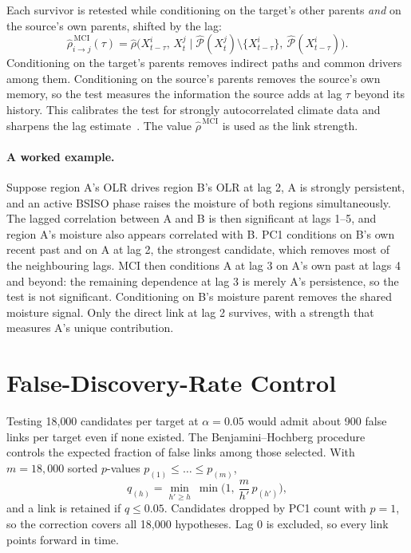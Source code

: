 Each survivor is retested while conditioning on the target's other parents \emph{and} on the source's own parents, shifted by the lag:
\begin{equation}
  \hat\rho^{\,\mathrm{MCI}}_{i\to j}(\tau)=\hat\rho\Big(X^i_{t-\tau},\,X^j_t\;\Big|\;\hat{\mathcal{P}}(X^j_t)\setminus\{X^i_{t-\tau}\},\ \hat{\mathcal{P}}(X^i_{t-\tau})\Big).
  \label{eq:mci}
\end{equation}
Conditioning on the target's parents removes indirect paths and common drivers among them. Conditioning on the source's parents removes the source's own memory, so the test measures the information the source adds at lag $\tau$ beyond its history. This calibrates the test for strongly autocorrelated climate data and sharpens the lag estimate~\cite{runge2019detecting}. The value $\hat\rho^{\,\mathrm{MCI}}$ is used as the link strength.

\paragraph{A worked example.} Suppose region A's OLR drives region B's OLR at lag 2, A is strongly persistent, and an active BSISO phase raises the moisture of both regions simultaneously. The lagged correlation between A and B is then significant at lags 1--5, and region A's moisture also appears correlated with B. PC1 conditions on B's own recent past and on A at lag 2, the strongest candidate, which removes most of the neighbouring lags. MCI then conditions A at lag 3 on A's own past at lags 4 and beyond: the remaining dependence at lag 3 is merely A's persistence, so the test is not significant. Conditioning on B's moisture parent removes the shared moisture signal. Only the direct link at lag 2 survives, with a strength that measures A's unique contribution.

\section{False-Discovery-Rate Control}
\label{sec:pcmci-fdr}

Testing 18{,}000 candidates per target at $\alpha=0.05$ would admit about 900 false links per target even if none existed. The Benjamini--Hochberg procedure~\cite{benjamini1995controlling} controls the expected fraction of false links among those selected. With $m=18{,}000$ sorted $p$-values $p_{(1)}\le\dots\le p_{(m)}$,
\begin{equation}
  q_{(h)}=\min_{h'\ge h}\ \min\!\Big(1,\ \frac{m}{h'}\,p_{(h')}\Big),
  \label{eq:bh}
\end{equation}
and a link is retained if $q\le0.05$. Candidates dropped by PC1 count with $p=1$, so the correction covers all 18{,}000 hypotheses. Lag 0 is excluded, so every link points forward in time.

